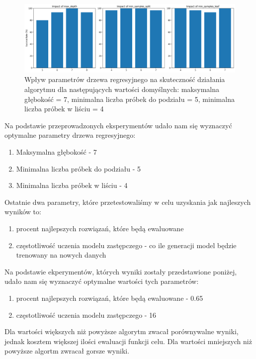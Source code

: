 \documentclass{article}
\begin{document}
\begin{figure}[H]
    \centering
    \includegraphics[width=\textwidth]{tree_parameter_tuning_separate_results3.png}
    \caption{Wpływ parametrów drzewa regresyjnego na skuteczność działania algorytmu dla następujących wartości domyślnych: maksymalna głębokość = 7, minimalna liczba próbek do podziału = 5, minimalna liczba próbek w liściu = 4}
    \label{fig:tree_parameter_results2}
\end{figure}

Na podstawie przeprowadzonych eksperymentów udało nam się wyznaczyć optymalne parametry drzewa regresyjnego:

\begin{enumerate}
    \item Maksymalna głębokość - 7
    \item Minimalna liczba próbek do podziału - 5
    \item Minimalna liczba próbek w liściu - 4
\end{enumerate}

Ostatnie dwa parametry, które przetestowaliśmy w celu uzyskania jak najleszych wyników to:
\begin{enumerate}
    \item procent najlepszych rozwiązań, które będą ewaluowane
    \item częstotliwość uczenia modelu zastępczego - co ile generacji model będzie trenowany na nowych danych
\end{enumerate}

Na podstawie ekperymentów, których wyniki zostały przedstawione poniżej, udało nam się wyznaczyć optymalne wartości tych parametrów:
\begin{enumerate}
    \item procent najlepszych rozwiązań, które będą ewaluowane - 0.65
    \item częstotliwość uczenia modelu zastępczego - 16
\end{enumerate}

Dla wartości większych niż powyższe algorytm zwacał porównywalne wyniki, jednak kosztem większej ilości ewaluacji funkcji celu. Dla wartości mniejszych niż powyższe algortm zwracał gorsze wyniki.
\end{document}
